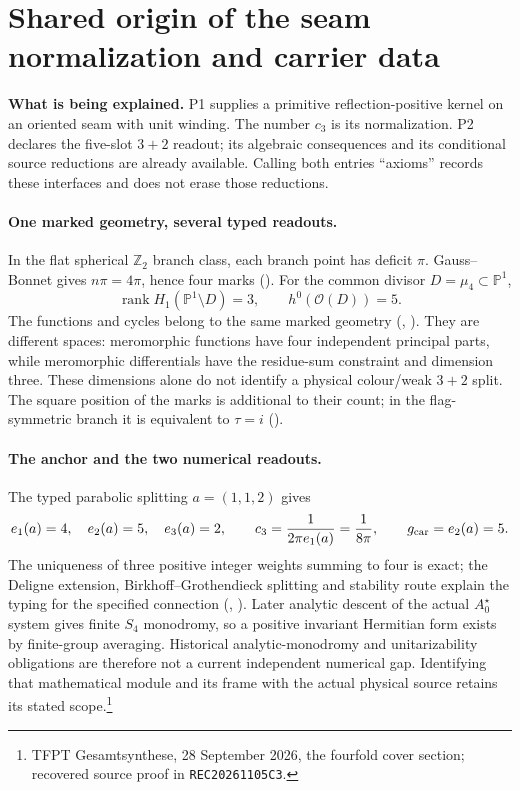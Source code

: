 \section{Shared origin of the seam normalization and carrier data}
\label{sec:shared-p1-p2-origin}

\noindent\textbf{What is being explained.} P1 supplies a primitive reflection-positive
kernel on an oriented seam with unit winding. The number $c_3$ is its normalization.
P2 declares the five-slot $3+2$ readout; its algebraic consequences and its
conditional source reductions are already available. Calling both entries
``axioms'' records these interfaces and does not erase those reductions.

\paragraph{One marked geometry, several typed readouts.}
In the flat spherical $\mathbb Z_2$ branch class, each branch point has deficit
$\pi$. Gauss--Bonnet gives $n\pi=4\pi$, hence four marks
(). For the common divisor
$D=\mu_4\subset\mathbb P^1$,
\[
 \operatorname{rank}H_1(\mathbb P^1\setminus D)=3,
 \qquad h^0(\mathcal O(D))=5.
\]
The functions and cycles belong to the same marked geometry
(,
). They are different spaces:
meromorphic functions have four independent principal parts, while
meromorphic differentials have the residue-sum constraint and dimension three.
These dimensions alone do not identify a physical colour/weak $3+2$ split.
The square position of the marks is additional to their count; in the
flag-symmetric branch it is equivalent to $\tau=i$
().

\paragraph{The anchor and the two numerical readouts.}
The typed parabolic splitting $a=(1,1,2)$ gives
\[
 e_1(a)=4,\quad e_2(a)=5,\quad e_3(a)=2,
 \qquad c_3=\frac{1}{2\pi e_1(a)}=\frac1{8\pi},
 \qquad g_{\rm car}=e_2(a)=5.
\]
The uniqueness of three positive integer weights summing to four is exact;
the Deligne extension, Birkhoff--Grothendieck splitting and stability route
explain the typing for the specified connection
(,
). Later analytic descent of
the actual $A_0^\star$ system gives finite $S_4$ monodromy, so a positive
invariant Hermitian form exists by finite-group averaging. Historical
analytic-monodromy and unitarizability obligations are therefore not a
current independent numerical gap. Identifying that mathematical module
and its frame with the actual physical source retains its stated scope.\footnote{TFPT Gesamtsynthese, 28 September 2026, the fourfold cover section; recovered source proof in \texttt{REC20261105C3}.}

